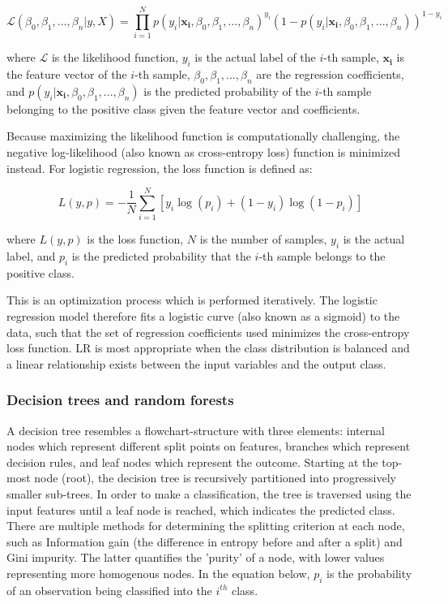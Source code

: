 $$\mathcal{L}(\beta_0, \beta_1, ..., \beta_n | y, X) = \prod_{i=1}^{N} p(y_i | \bm{x_i}, \beta_0, \beta_1, ..., \beta_n)^{y_i} \left(1 - p(y_i | \bm{x_i}, \beta_0, \beta_1, ..., \beta_n)\right)^{1 - y_i}$$

where $\mathcal{L}$ is the likelihood function, $y_i$ is the actual label of the $i$-th sample, $\bm{x_i}$ is the feature vector of the $i$-th sample, $\beta_0, \beta_1, ..., \beta_n$ are the regression coefficients, and $p(y_i | \bm{x_i}, \beta_0, \beta_1, ..., \beta_n)$ is the predicted probability of the $i$-th sample belonging to the positive class given the feature vector and coefficients.

Because maximizing the likelihood function is computationally challenging, the negative log-likelihood (also known as cross-entropy loss) function is minimized instead. For logistic regression, the loss function is defined as:

\[ L(y, p) = -\frac{1}{N} \sum_{i=1}^{N} \left[ y_i \log(p_i) + (1 - y_i) \log(1 - p_i) \right] \]

where $L(y, p)$ is the loss function, $N$ is the number of samples, $y_i$ is the actual label, and $p_i$ is the predicted probability that the $i$-th sample belongs to the positive class.

This is an optimization process which is performed iteratively. The logistic regression model therefore fits a logistic curve (also known as a sigmoid) to the data, such that the set of regression coefficients used minimizes the cross-entropy loss function. LR is most appropriate when the class distribution is balanced and a linear relationship exists between the input variables and the output class.

\subsubsection{Decision trees and random forests}

A decision tree resembles a flowchart-structure with three elements: internal nodes which represent different split points on features, branches which represent decision rules, and leaf nodes which represent the outcome. Starting at the top-most node (root), the decision tree is recursively partitioned into progressively smaller sub-trees. In order to make a classification, the tree is traversed using the input features until a leaf node is reached, which indicates the predicted class. There are multiple methods for determining the splitting criterion at each node, such as Information gain (the difference in entropy before and after a split) and Gini impurity. The latter quantifies the 'purity' of a node, with lower values representing more homogenous nodes. In the equation below, $p_i$ is the probability of an observation being classified into the $i^{th}$ class.

